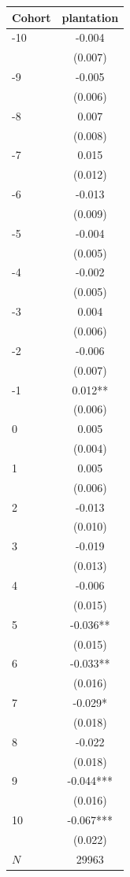 {
\def\sym#1{\ifmmode^{#1}\else\(^{#1}\)\fi}
\begin{tabular}{l*{1}{c}}
\toprule
Cohort    &plantation   \\
\midrule
-10       &   -0.004   \\
          &  (0.007)   \\
-9        &   -0.005   \\
          &  (0.006)   \\
-8        &    0.007   \\
          &  (0.008)   \\
-7        &    0.015   \\
          &  (0.012)   \\
-6        &   -0.013   \\
          &  (0.009)   \\
-5        &   -0.004   \\
          &  (0.005)   \\
-4        &   -0.002   \\
          &  (0.005)   \\
-3        &    0.004   \\
          &  (0.006)   \\
-2        &   -0.006   \\
          &  (0.007)   \\
-1        &    0.012** \\
          &  (0.006)   \\
0         &    0.005   \\
          &  (0.004)   \\
1         &    0.005   \\
          &  (0.006)   \\
2         &   -0.013   \\
          &  (0.010)   \\
3         &   -0.019   \\
          &  (0.013)   \\
4         &   -0.006   \\
          &  (0.015)   \\
5         &   -0.036** \\
          &  (0.015)   \\
6         &   -0.033** \\
          &  (0.016)   \\
7         &   -0.029*  \\
          &  (0.018)   \\
8         &   -0.022   \\
          &  (0.018)   \\
9         &   -0.044***\\
          &  (0.016)   \\
10        &   -0.067***\\
          &  (0.022)   \\
\midrule
\(N\)     &    29963   \\
\bottomrule
\end{tabular}
}
